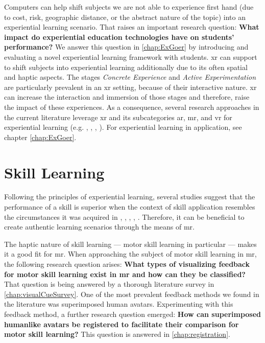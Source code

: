 Computers can help shift subjects we are not able to experience first hand (due to cost, risk, geographic distance, or the abstract nature of the topic) into an experiential learning scenario.
That raises an important research question: \textbf{What impact do experiential education technologies have on students' performance?}
We answer this question in \autoref{chap:ExGoer} by introducing and evaluating a novel experiential learning framework with students.
\Acrshort{xr} can support to shift subjects into experiential learning additionally due to its often spatial and haptic aspects.
The stages \emph{Concrete Experience} and \emph{Active Experimentation} are particularly prevalent in an \acrshort{xr} setting, because of their interactive nature.
\acrshort{xr} can increase the interaction and immersion of those stages and therefore, raise the impact of these experiences.
As a consequence, several research approaches in the current literature leverage \acrshort{xr} and its subcategories \acrshort{ar}, \acrshort{mr}, and \acrshort{vr} for experiential learning (e.g. \cite{asad2021virtual}, \cite{majgaard2020virtual}, \cite{wang2007experiential}, \cite{pueschel:2013:MRCG}).
For experiential learning in application, see chapter \autoref{chap:ExGoer}.

\section{Skill Learning \label{sec:skill}}
Following the principles of experiential learning, several studies suggest that the performance of a skill is superior when the context of skill application resembles the circumstances it was acquired in \cite{godden1975context}, \cite{ruitenberg2012context}, \cite{smith2001environmental}, \cite{anderson1998contextual}, \cite{wright1991contextual}.
Therefore, it can be beneficial to create authentic learning scenarios through the means of \acrshort{mr}.

The haptic nature of skill learning --- motor skill learning in particular --- makes it a good fit for \acrshort{mr}.
When approaching the subject of motor skill learning in \acrshort{mr}, the following research question arises: \textbf{What types of visualizing feedback for motor skill learning exist in \acrlong{mr} and how can they be classified?}
That question is being answered by a thorough literature survey in \autoref{chap:visualCueSurvey}.
One of the most prevalent feedback methods we found in the literature was superimposed human avatars.
Experimenting with this feedback method, a further research question emerged: \textbf{How can superimposed humanlike avatars be registered to facilitate their comparison for motor skill learning?}
This question is answered in \autoref{chap:registration}.

